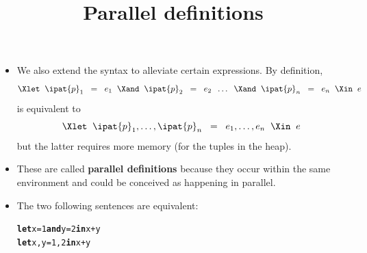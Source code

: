 \documentclass[wide]{slides}
\begin{document}
\begin{slide}
  \title{Parallel definitions}

  \begin{itemize}

    \item We also extend the syntax to alleviate certain
      expressions. By definition,
      \begin{equation*}
        \Xlet \;\; \ipat{p}_1 \;\; = \;\; e_1 \;\;
        \Xand \;\; \ipat{p}_2 \;\; = \;\; e_2 \;\; \ldots \;\;
        \Xand \;\; \ipat{p}_n \;\; = \;\; e_n \;\; \Xin \;\; e
      \end{equation*}
      is equivalent to
      \begin{equation*}
        \Xlet \;\; \ipat{p}_1, \ldots, \ipat{p}_n \;\; = \;\; e_1,
        \ldots, e_n \;\; \Xin \;\; e
      \end{equation*}
      but the latter requires more memory (for the tuples in the heap).

    \item These are called \textbf{parallel definitions} because they
      occur within the same environment and could be conceived as
      happening in parallel.

    \item The two following sentences are equivalent:
      \smallskip
\begin{alltt}
\textbf{let} x = 1 \textbf{and} y = 2 \textbf{in} x + y
\textbf{let} x,y = 1,2 \textbf{in} x + y
\end{alltt}

  \end{itemize}

\end{slide}
\end{document}
